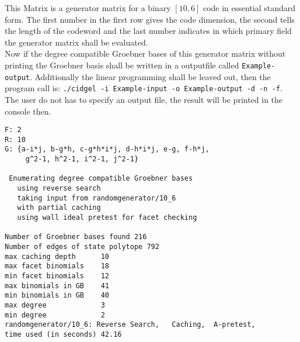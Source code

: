 This Matrix is a generator matrix for a binary $[10,6]$ code in essential standard form. 
The first number in the first row gives the code dimension, the second tells the length of the codeword and the last number indicates in which primary field the generator matrix shall be evaluated.\\

Now if the degree compatible Groebner bases of this generator  matrix without printing the Groebner basis shall be written in a outputfile called \texttt{Example-output}. Additionally the linear programming shall be leaved out, then the program call is: \texttt{./cidgel -i Example-input -o Example-output -d -n -f}.
The user do not has to specify an output file, the result will be printed in the console then.

\newpage

 \begin{lstlisting}[basicstyle=\fontfamily{courier}\selectfont,language={}] %
% starting GB:
F: 2
R: 10
G: {a-i*j, b-g*h, c-g*h*i*j, d-h*i*j, e-g, f-h*j,
	 g^2-1, h^2-1, i^2-1, j^2-1}

 Enumerating degree compatible Groebner bases
   using reverse search
   taking input from randomgenerator/10_6
   with partial caching
   using wall ideal pretest for facet checking

Number of Groebner bases found 216
Number of edges of state polytope 792
max caching depth      10
max facet binomials    18
min facet binomials    12
max binomials in GB    41
min binomials in GB    40
max degree             3
min degree             2
randomgenerator/10_6: Reverse Search,   Caching,  A-pretest,
time used (in seconds) 42.16
\end{lstlisting}
  



